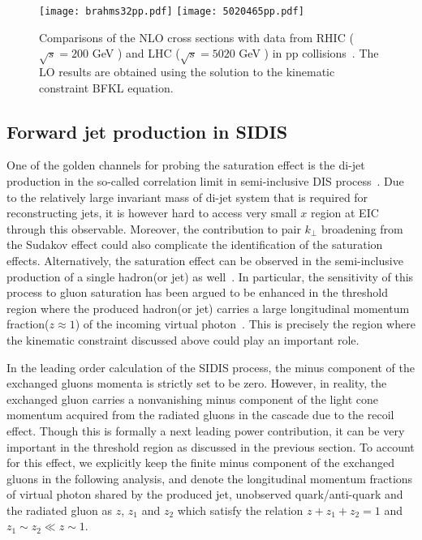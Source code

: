 \documentclass[prd,aps,preprint,tightenlines,nofootinbib,superscriptaddress]{revtex4}
\begin{document}
\begin{figure}[h!]\centering
\texttt{[image: brahms32pp.pdf]}
\texttt{[image: 5020465pp.pdf]}
\caption{Comparisons of the  NLO cross sections with data from RHIC ($\sqrt{s} = 200 $ GeV ) and LHC ($\sqrt{s} = 5020 $ GeV )   in pp collisions~\cite{BRAHMS:2004xry, LHCb:2021vww}. The LO results are obtained using the solution to the kinematic constraint BFKL equation.
}
\label{fig:lhcvsrhic}
\end{figure}
 
  
\subsection{Forward jet production in SIDIS }
One of the golden channels for probing the saturation effect is the  di-jet production in the so-called correlation limit in semi-inclusive DIS process~\cite{Kovner:2001vi,Gelis:2002nn,Dominguez:2011wm,Metz:2011wb}. Due to the relatively large invariant mass of di-jet system that is required for reconstructing jets, it is however hard to access very small $x$ region at EIC through this observable. Moreover, the contribution to pair $k_\perp$ broadening from the Sudakov effect could also complicate the identification of  the saturation effects. Alternatively,  the saturation effect can be observed in the semi-inclusive production of a single hadron(or jet) as well~\cite{Mueller:1999wm}. In particular,  the sensitivity of this process to gluon saturation has been argued to be enhanced in the threshold region where the produced hadron(or jet)  carries a large longitudinal momentum fraction($z \approx 1$)  of the incoming virtual photon~\cite{Iancu:2020jch}.  This is precisely the region where the kinematic constraint discussed above could play an important role. 

In the leading order calculation of the SIDIS process, the minus component of  the exchanged gluons momenta is strictly set to be zero.  However, in reality,  the exchanged gluon carries a nonvanishing minus component of the light cone momentum acquired from the radiated gluons in the cascade  due to the recoil effect. Though this is formally a next leading power contribution, it can be very important in the threshold region as discussed in the previous section. To account for this effect, we explicitly keep the finite minus component of the exchanged gluons in the following analysis, and   denote the longitudinal momentum fractions of virtual photon shared by the produced jet, unobserved quark/anti-quark and the radiated gluon as $z$, $z_1$ and $z_2$ which satisfy the relation $z+z_1+z_2=1$ and $z_1\sim z_2 \ll z\sim 1$.
\end{document}
